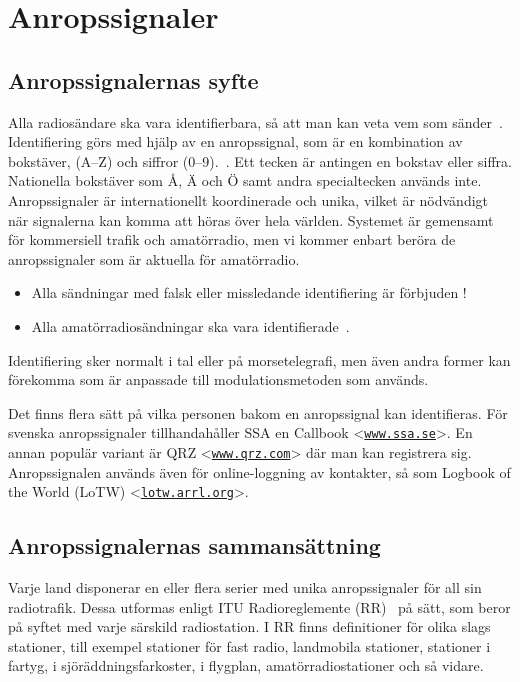 \section{Anropssignaler}
\label{anropssignaler}

\subsection{Anropssignalernas syfte}

Alla radiosändare ska vara identifierbara, så att man kan veta vem som
sänder~\cite[\S19.1]{ITU-RR}.
Identifiering görs med hjälp av en anropssignal, som är en kombination av
bokstäver, (A--Z) och siffror (0--9).~\cite[\S19.45]{ITU-RR}.
Ett tecken är antingen en bokstav eller siffra.
Nationella bokstäver som Å, Ä och Ö samt andra specialtecken används inte.
Anropssignaler är internationellt koordinerade och unika, vilket är nödvändigt
när signalerna kan komma att höras över hela världen.
Systemet är gemensamt för kommersiell trafik och amatörradio, men vi kommer
enbart beröra de anropssignaler som är aktuella för amatörradio.

\begin{itemize}
\item Alla sändningar med falsk eller missledande identifiering är förbjuden
\cite[\S19.2]{ITU-RR}!

\item Alla amatörradiosändningar ska vara identifierade~\cite[\S19.4, \S19.5]{ITU-RR}.
\end{itemize}

Identifiering sker normalt i tal eller på morsetelegrafi, men även andra former
kan förekomma som är anpassade till modulationsmetoden som används.

Det finns flera sätt på vilka personen bakom en anropssignal kan identifieras.
För svenska anropssignaler tillhandahåller SSA en Callbook
<\href{https://www.ssa.se/}{\texttt{www.ssa.se}}>.
En annan populär variant är QRZ
<\href{https://www.qrz.com/}{\texttt{www.qrz.com}}> där man kan registrera sig.
Anropssignalen används även för online-loggning av kontakter, så som Logbook of
the World (LoTW) <\href{https://lotw.arrl.org/}{\texttt{lotw.arrl.org}}>.

\subsection{Anropssignalernas sammansättning}

Varje land disponerar en eller flera serier med unika anropssignaler för all
sin radiotrafik.
Dessa utformas enligt ITU Radioreglemente (RR)~\cite[\S19]{ITU-RR} på sätt,
som beror på syftet med varje särskild radiostation.
I RR finns definitioner för olika slags stationer, till exempel stationer för
fast radio, landmobila stationer, stationer i fartyg, i sjöräddningsfarkoster,
i flygplan, amatörradiostationer och så vidare.

